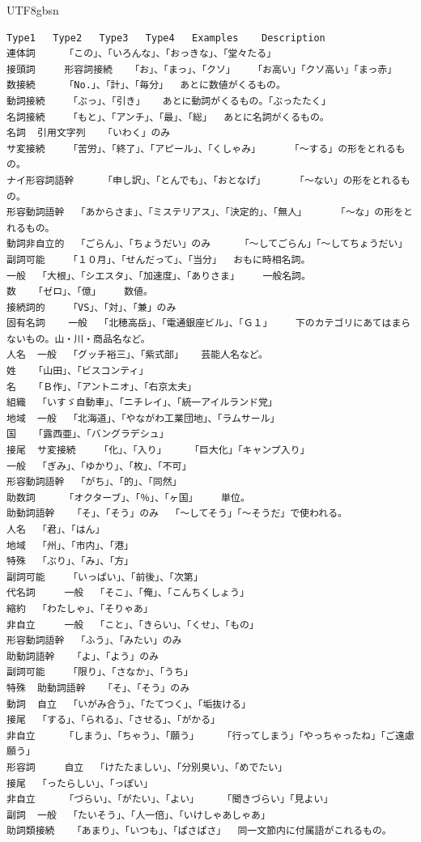 \documentclass[12pt]{book} %
\begin{document}
\begin{CJK}{UTF8}{gbsn}
\begin{verbatim}
Type1 	Type2 	Type3 	Type4 	Examples 	Description
連体詞 	「この」、「いろんな」、「おっきな」、「堂々たる」 	
接頭詞 	形容詞接続 	「お」、「まっ」、「クソ」 	「お高い」「クソ高い」「まっ赤」
数接続 	「No.」、「計」、「毎分」 	あとに数値がくるもの。
動詞接続 	「ぶっ」、「引き」 	あとに動詞がくるもの。「ぶったたく」
名詞接続 	「もと」、「アンチ」、「最」、「総」 	あとに名詞がくるもの。
名詞 	引用文字列 	「いわく」のみ 	
サ変接続 	「苦労」、「終了」、「アピール」、「くしゃみ」 	「～する」の形をとれるもの。
ナイ形容詞語幹 	「申し訳」、「とんでも」、「おとなげ」 	「～ない」の形をとれるもの。
形容動詞語幹 	「あからさま」、「ミステリアス」、「決定的」、「無人」 	「～な」の形をとれるもの。
動詞非自立的 	「ごらん」、「ちょうだい」のみ 	「～してごらん」「～してちょうだい」
副詞可能 	「１０月」、「せんだって」、「当分」 	おもに時相名詞。
一般 	「大根」、「シエスタ」、「加速度」、「ありさま」 	一般名詞。
数 	「ゼロ」、「億」 	数値。
接続詞的 	「VS」、「対」、「兼」のみ 	
固有名詞 	一般 	「北穂高岳」、「電通銀座ビル」、「Ｇ１」 	下のカテゴリにあてはまらないもの。山・川・商品名など。
人名 	一般 	「グッチ裕三」、「紫式部」 	芸能人名など。
姓 	「山田」、「ビスコンティ」 	
名 	「Ｂ作」、「アントニオ」、「右京太夫」 	
組織 	「いすゞ自動車」、「ニチレイ」、「統一アイルランド党」 	
地域 	一般 	「北海道」、「やながわ工業団地」、「ラムサール」 	
国 	「露西亜」、「バングラデシュ」 	
接尾 	サ変接続 	「化」、「入り」 	「巨大化」「キャンプ入り」
一般 	「ぎみ」、「ゆかり」、「枚」、「不可」 	
形容動詞語幹 	「がち」、「的」、「同然」 	
助数詞 	「オクターブ」、「％」、「ヶ国」 	単位。
助動詞語幹 	「そ」、「そう」のみ 	「～してそう」「～そうだ」で使われる。
人名 	「君」、「はん」 	
地域 	「州」、「市内」、「港」 	
特殊 	「ぶり」、「み」、「方」 	
副詞可能 	「いっぱい」、「前後」、「次第」 	
代名詞 	一般 	「そこ」、「俺」、「こんちくしょう」 	
縮約 	「わたしゃ」、「そりゃあ」 	
非自立 	一般 	「こと」、「きらい」、「くせ」、「もの」 	
形容動詞語幹 	「ふう」、「みたい」のみ 	
助動詞語幹 	「よ」、「よう」のみ 	
副詞可能 	「限り」、「さなか」、「うち」 	
特殊 	助動詞語幹 	「そ」、「そう」のみ 	
動詞 	自立 	「いがみ合う」、「たてつく」、「垢抜ける」 	
接尾 	「する」、「られる」、「させる」、「がかる」 	
非自立 	「しまう」、「ちゃう」、「願う」 	「行ってしまう」「やっちゃったね」「ご遠慮願う」
形容詞 	自立 	「けたたましい」、「分別臭い」、「めでたい」 	
接尾 	「ったらしい」、「っぽい」 	
非自立 	「づらい」、「がたい」、「よい」 	「聞きづらい」「見よい」
副詞 	一般 	「たいそう」、「人一倍」、「いけしゃあしゃあ」 	
助詞類接続 	「あまり」、「いつも」、「ぱさぱさ」 	同一文節内に付属語がこれるもの。

\end{verbatim}
\end{CJK}
\end{document}
